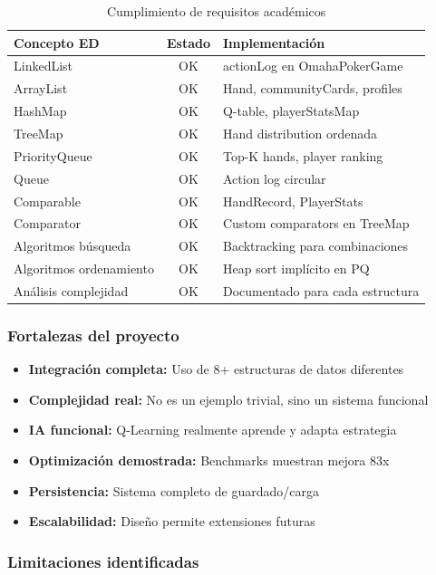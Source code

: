 \documentclass[12pt,a4paper]{article}
\begin{document}
\begin{table}[H]
\centering
\begin{tabular}{|l|c|l|}
\hline
\textbf{Concepto ED} & \textbf{Estado} & \textbf{Implementación} \\
\hline
LinkedList & OK & actionLog en OmahaPokerGame \\
ArrayList & OK & Hand, communityCards, profiles \\
HashMap & OK & Q-table, playerStatsMap \\
TreeMap & OK & Hand distribution ordenada \\
PriorityQueue & OK & Top-K hands, player ranking \\
Queue & OK & Action log circular \\
Comparable & OK & HandRecord, PlayerStats \\
Comparator & OK & Custom comparators en TreeMap \\
\hline
Algoritmos búsqueda & OK & Backtracking para combinaciones \\
Algoritmos ordenamiento & OK & Heap sort implícito en PQ \\
Análisis complejidad & OK & Documentado para cada estructura \\
\hline
\end{tabular}
\caption{Cumplimiento de requisitos académicos}
\end{table}

\subsubsection{Fortalezas del proyecto}

\begin{itemize}
    \item \textbf{Integración completa:} Uso de 8+ estructuras de datos diferentes
    \item \textbf{Complejidad real:} No es un ejemplo trivial, sino un sistema funcional
    \item \textbf{IA funcional:} Q-Learning realmente aprende y adapta estrategia
    \item \textbf{Optimización demostrada:} Benchmarks muestran mejora 83x
    \item \textbf{Persistencia:} Sistema completo de guardado/carga
    \item \textbf{Escalabilidad:} Diseño permite extensiones futuras
\end{itemize}

\subsubsection{Limitaciones identificadas}
\end{document}

